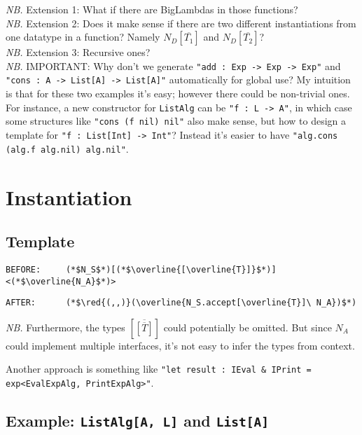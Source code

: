 \documentclass{article}
\newcommand{\red}[1]{\textcolor{red}{#1}}
\newcommand{\nb}{\textit{NB. }}
\begin{document}
\begin{spacing}{1.1}
\nb Extension 1: What if there are BigLambdas in those functions?\\

\nb Extension 2: Does it make sense if there are two different instantiations from one datatype in a function? Namely $N_D[\overline{T_1}]$ and $N_D[\overline{T_2}]$?\\

\nb Extension 3: Recursive ones?\\

\nb IMPORTANT: Why don't we generate \lstinline{"add : Exp -> Exp -> Exp"} and \lstinline{"cons : A -> List[A] -> List[A]"} automatically for global use? My intuition is that for these two examples it's easy; however there could be non-trivial ones. For instance, a new constructor for \lstinline{ListAlg} can be \lstinline{"f : L -> A"}, in which case some structures like \lstinline{"cons (f nil)}\lstinline{ nil"} also make sense, but how to design a template for \lstinline{"f : List[Int] -> Int"}? Instead it's easier to have \lstinline{"alg.cons (alg.f alg.nil)}\lstinline{ alg.nil"}.

\section{Instantiation}

\subsection{Template}

\begin{lstlisting}[numbers=none]
BEFORE:     (*$N_S$*)[(*$\overline{[\overline{T}]}$*)]<(*$\overline{N_A}$*)>
\end{lstlisting}
\begin{lstlisting}[numbers=none]
AFTER:      (*$\red{(,,)}(\overline{N_S.accept[\overline{T}]\ N_A})$*)
\end{lstlisting}

\nb Furthermore, the types $[\overline{[\overline{T}]}]$ could potentially be omitted. But since $N_A$ could implement multiple interfaces, it's not easy to infer the types from context.

Another approach is something like \lstinline{"let result : IEval & IPrint = exp<EvalExpAlg, PrintExpAlg>"}.

\subsection{Example: \lstinline{ListAlg[A, L]} and \lstinline{List[A]}}


\end{spacing}
\end{document}
